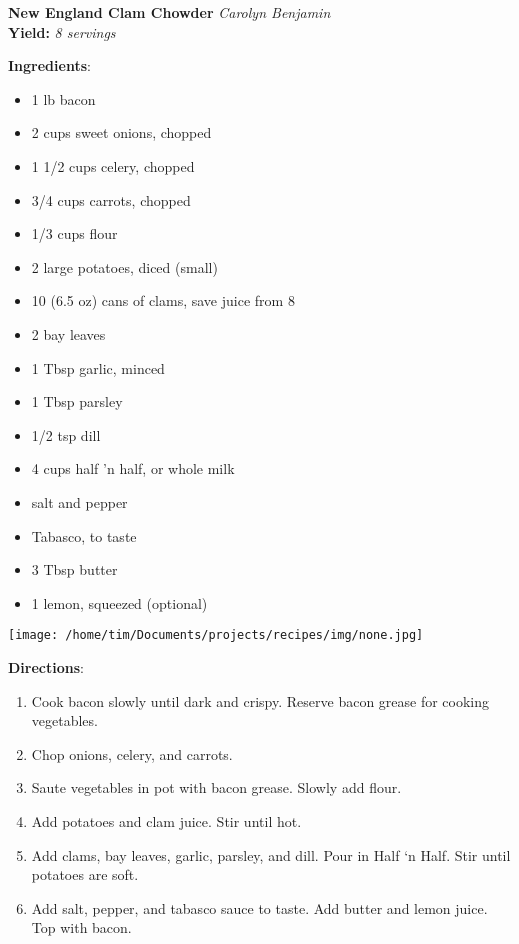 \documentclass[11pt, twoside, openany]{book}
\begin{document}
\noindent\begin{minipage}[t]{\linewidth}%
{\Large\textbf{New England Clam Chowder}} \label{new-england-clam-chowder}\hfill\textit{Carolyn Benjamin}\\
\textbf{Yield:} \textit{8 servings}\\
\noindent\begin{minipage}[t]{0.78\linewidth}%
\textbf{Ingredients}:\vspace{-3mm}
\begin{multicols}{2}
\begin{itemize}\setlength\itemsep{-1mm}
\item 1 lb bacon
\item 2 cups sweet onions, chopped
\item 1 1/2 cups celery, chopped
\item 3/4 cups carrots, chopped
\item 1/3 cups flour
\item 2 large potatoes, diced (small)
\item 10 (6.5 oz) cans of clams, save juice from 8
\item 2 bay leaves
\item 1 Tbsp garlic, minced
\item 1 Tbsp parsley
\item 1/2 tsp dill
\item 4 cups half 'n half, or whole milk
\item salt and pepper
\item Tabasco, to taste
\item 3 Tbsp butter
\item 1 lemon, squeezed (optional)
\end{itemize}
\end{multicols}
\end{minipage}
\noindent\begin{minipage}[t]{0.18\linewidth}
\centering \strut\vspace*{-\baselineskip}\newline
\texttt{[image: /home/tim/Documents/projects/recipes/img/none.jpg]}\\
\end{minipage}\vspace{3mm}
\textbf{Directions}:
\vspace{-3mm}\begin{enumerate}\setlength\itemsep{-1mm}
\item Cook bacon slowly until dark and crispy. Reserve bacon grease for cooking vegetables.
\item  Chop onions, celery, and carrots.
\item  Saute vegetables in pot with bacon grease. Slowly add flour.
\item Add potatoes and clam juice. Stir until hot.
\item Add clams, bay leaves, garlic, parsley, and dill. Pour in Half ‘n Half. Stir until potatoes are soft.
\item Add salt, pepper, and tabasco sauce to taste. Add butter and lemon juice. Top with bacon.
\end{enumerate}
\end{minipage}\vspace{8mm}
\end{document}

